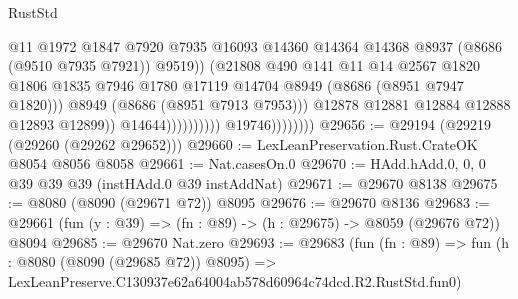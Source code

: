 \begin{lexlean}{RustStd}
\begin{coremodule}
                                                  @11
                                                  @1972
                                                  @1847
                                                  @7920
                                                  @7935
                                                  @16093
                                                  @14360
                                                  @14364
                                                  @14368
                                                  @8937
                                                  (@8686 (@9510 @7935 @7921))
                                                  @9519))
                                              (@21808
                                                @490
                                                @141
                                                @11
                                                @14
                                                @2567
                                                @1820
                                                @1806
                                                @1835
                                                @7946
                                                @1780
                                                @17119
                                                @14704
                                                @8949
                                                (@8686 (@8951 @7947 @1820)))
                                              @8949
                                              (@8686 (@8951 @7913 @7953)))
                                            @12878
                                            @12881
                                            @12884
                                            @12888
                                            @12893
                                            @12899))
                                        @14644))))))))))
                    @19746))))))))
@29656 := @29194 (@29219 (@29260 (@29262 @29652)))
@29660 := LexLeanPreservation.Rust.CrateOK @8054 @8056 @8058
@29661 := Nat.casesOn.{0}
@29670 := HAdd.hAdd.{0, 0, 0} @39 @39 @39 (instHAdd.{0} @39 instAddNat)
@29671 := @29670 @8138
@29675 := @8080 (@8090 (@29671 @72)) @8095
@29676 := @29670 @8136
@29683 := @29661 (fun (y : @39) => (fn : @89) -> (h : @29675) -> @8059 (@29676 @72)) @8094
@29685 := @29670 Nat.zero
@29693 := @29683
    (fun (fn : @89) =>
    fun (h : @8080 (@8090 (@29685 @72)) @8095) =>
    LexLeanPreserve.C130937e62a64004ab578d60964c74dcd.R2.RustStd.fun0)

\end{coremodule}
\end{lexlean}
